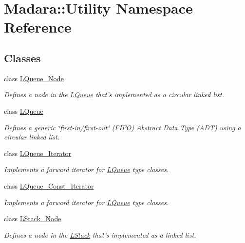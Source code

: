 \hypertarget{namespaceMadara_1_1Utility}{
\section{Madara::Utility Namespace Reference}
\label{d9/d22/namespaceMadara_1_1Utility}
}
\subsection*{Classes}
\begin{DoxyCompactItemize}
\item 
class \hyperlink{classMadara_1_1Utility_1_1LQueue__Node}{LQueue\_\-Node}
\begin{DoxyCompactList}\small\item\em Defines a node in the {\itshape \hyperlink{classMadara_1_1Utility_1_1LQueue}{LQueue}\/} that's implemented as a circular linked list. \item\end{DoxyCompactList}\item 
class \hyperlink{classMadara_1_1Utility_1_1LQueue}{LQueue}
\begin{DoxyCompactList}\small\item\em Defines a generic \char`\"{}first-\/in/first-\/out\char`\"{} (FIFO) Abstract Data Type (ADT) using a circular linked list. \item\end{DoxyCompactList}\item 
class \hyperlink{classMadara_1_1Utility_1_1LQueue__Iterator}{LQueue\_\-Iterator}
\begin{DoxyCompactList}\small\item\em Implements a forward iterator for \hyperlink{classMadara_1_1Utility_1_1LQueue}{LQueue} type classes. \item\end{DoxyCompactList}\item 
class \hyperlink{classMadara_1_1Utility_1_1LQueue__Const__Iterator}{LQueue\_\-Const\_\-Iterator}
\begin{DoxyCompactList}\small\item\em Implements a forward iterator for \hyperlink{classMadara_1_1Utility_1_1LQueue}{LQueue} type classes. \item\end{DoxyCompactList}\item 
class \hyperlink{classMadara_1_1Utility_1_1LStack__Node}{LStack\_\-Node}
\begin{DoxyCompactList}\small\item\em Defines a node in the {\itshape \hyperlink{classMadara_1_1Utility_1_1LStack}{LStack}\/} that's implemented as a linked list. \item\end{DoxyCompactList}\item 

\end{DoxyCompactItemize}
